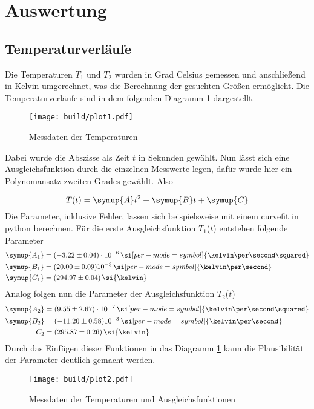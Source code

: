 \section{Auswertung}
\subsection{Temperaturverläufe}
Die Temperaturen $T_{1}$ und $T_{2}$ wurden in Grad Celsius gemessen und anschließend in Kelvin umgerechnet, was die Berechnung
der gesuchten Größen ermöglicht. Die Temperaturverläufe sind in dem folgenden Diagramm \ref{fig:plot1} dargestellt.
\begin{figure}[h]
  \centering
  \texttt{[image: build/plot1.pdf]}
  \caption{Messdaten der Temperaturen}
  \label{fig:plot1}
\end{figure}
\begin{flushleft}
Dabei wurde die Abszisse als Zeit $t$ in Sekunden gewählt. Nun lässt sich eine Ausgleichsfunktion durch
die einzelnen Messwerte legen, dafür wurde hier ein Polynomansatz zweiten Grades gewählt. Also
\end{flushleft}
\begin{equation}
T(t) = \symup{A} t^{2} + \symup{B} t + \symup{C}
\end{equation}
Die Parameter, inklusive Fehler, lassen sich beispielsweise mit einem curvefit in python berechnen.
Für die erste Ausgleichsfunktion $T_{1}$($t$) entstehen folgende Parameter
\begin{align}
\symup{A_{1}} &= (-3.22 \pm 0.04)\cdot 10^{-6} \, \si[per-mode=symbol]{\kelvin\per\second\squared}\\
\symup{B_{1}} &= (20.00 \pm 0.09) 10^{-3} \,\si[per-mode=symbol]{\kelvin\per\second}\\
\symup{C_{1}} &= (294.97 \pm 0.04) \,\si{\kelvin}
\end{align}
Analog folgen nun die Parameter der Ausgleichsfunktion $T_{2}$($t$)
\begin{align}
\symup{A_{2}} &= (9.55 \pm 2.67)\cdot 10^{-7} \, \si[per-mode=symbol]{\kelvin\per\second\squared}\\
\symup{B_{2}} &= (-11.20 \pm 0.58) 10^{-3} \,\si[per-mode=symbol]{\kelvin\per\second}\\
C_{2} &= (295.87 \pm 0.26) \,\si{\kelvin}
\end{align}
Durch das Einfügen dieser Funktionen in das Diagramm \ref{fig:plot1} kann die Plausibilität
der Parameter deutlich gemacht werden.
\begin{figure}[h]
  \centering
  \texttt{[image: build/plot2.pdf]}
  \caption{Messdaten der Temperaturen und Ausgleichsfunktionen}
  \label{fig:plot2}
\end{figure}
